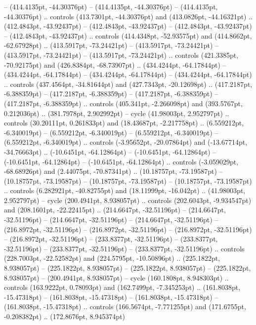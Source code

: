  -- (414.4135pt, -44.30376pt)
 -- (414.4135pt, -44.30376pt)
 -- (414.4135pt, -44.30376pt) .. controls (413.7301pt, -44.30376pt) and (413.0826pt, -44.16321pt) .. (412.4843pt, -43.92437pt)
 -- (412.4843pt, -43.92437pt)
 -- (412.4843pt, -43.92437pt)
 -- (412.4843pt, -43.92437pt) .. controls (414.4348pt, -52.93575pt) and (414.8662pt, -62.67928pt) .. (413.5917pt, -73.24421pt)
 -- (413.5917pt, -73.24421pt)
 -- (413.5917pt, -73.24421pt)
 -- (413.5917pt, -73.24421pt) .. controls (421.3385pt, -70.92175pt) and (426.8384pt, -68.73907pt) .. (434.4244pt, -64.17844pt)
 -- (434.4244pt, -64.17844pt)
 -- (434.4244pt, -64.17844pt)
 -- (434.4244pt, -64.17844pt) .. controls (437.4564pt, -34.81644pt) and (427.7343pt, -20.12698pt) .. (417.2187pt, -6.388359pt)
 -- (417.2187pt, -6.388359pt)
 -- (417.2187pt, -6.388359pt)
 -- (417.2187pt, -6.388359pt) .. controls (405.341pt, -2.266098pt) and (393.5767pt, 0.212036pt) .. (381.7978pt, 2.902992pt) -- cycle
(41.98003pt, 2.952797pt) .. controls (30.20111pt, 0.261833pt) and (18.43687pt, -2.217758pt) .. (6.559212pt, -6.340019pt)
 -- (6.559212pt, -6.340019pt)
 -- (6.559212pt, -6.340019pt)
 -- (6.559212pt, -6.340019pt) .. controls (-3.95652pt, -20.07864pt) and (-13.67714pt, -34.76663pt) .. (-10.6451pt, -64.12864pt)
 -- (-10.6451pt, -64.12864pt)
 -- (-10.6451pt, -64.12864pt)
 -- (-10.6451pt, -64.12864pt) .. controls (-3.059029pt, -68.68926pt) and (2.44075pt, -70.87341pt) .. (10.18757pt, -73.19587pt)
 -- (10.18757pt, -73.19587pt)
 -- (10.18757pt, -73.19587pt)
 -- (10.18757pt, -73.19587pt) .. controls (6.282921pt, -40.82755pt) and (18.11999pt, -16.042pt) .. (41.98003pt, 2.952797pt) -- cycle
(200.4941pt, 8.938057pt) .. controls (202.6043pt, -9.934547pt) and (208.1601pt, -22.22415pt) .. (214.6647pt, -32.51196pt)
 -- (214.6647pt, -32.51196pt)
 -- (214.6647pt, -32.51196pt)
 -- (214.6647pt, -32.51196pt)
 -- (216.8972pt, -32.51196pt)
 -- (216.8972pt, -32.51196pt)
 -- (216.8972pt, -32.51196pt)
 -- (216.8972pt, -32.51196pt)
 -- (233.8377pt, -32.51196pt)
 -- (233.8377pt, -32.51196pt)
 -- (233.8377pt, -32.51196pt)
 -- (233.8377pt, -32.51196pt) .. controls (228.7003pt, -22.52582pt) and (224.5795pt, -10.50896pt) .. (225.1822pt, 8.938057pt)
 -- (225.1822pt, 8.938057pt)
 -- (225.1822pt, 8.938057pt)
 -- (225.1822pt, 8.938057pt)
 -- (200.4941pt, 8.938057pt) -- cycle
(160.1808pt, 8.948303pt) .. controls (163.9222pt, 0.78093pt) and (162.7499pt, -7.345253pt) .. (161.8038pt, -15.47318pt)
 -- (161.8038pt, -15.47318pt)
 -- (161.8038pt, -15.47318pt)
 -- (161.8038pt, -15.47318pt) .. controls (166.5674pt, -7.771255pt) and (171.6755pt, -0.208382pt) .. (172.8676pt, 8.945374pt)
